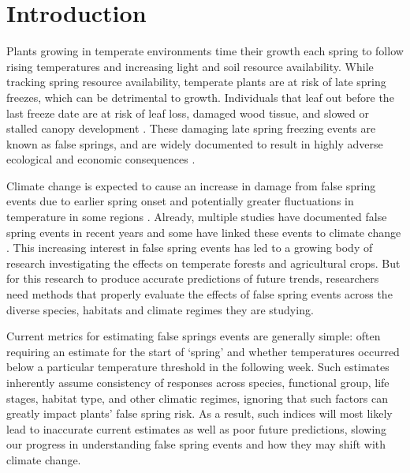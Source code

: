 \documentclass{article}\usepackage[]{graphicx}\usepackage[]{color}
\begin{document}
\section{Introduction}

Plants growing in temperate environments time their growth each spring to follow rising temperatures and increasing light and soil resource availability. While tracking spring resource availability, temperate plants are at risk of late spring freezes, which can be detrimental to growth. Individuals that leaf out before the last freeze date are at risk of leaf loss, damaged wood tissue, and slowed or stalled canopy development \citep{Gu2008, Hufkens2012}. These damaging late spring freezing events are known as false springs, and are widely documented to result in highly adverse ecological and economic consequences \citep{Knudson2012, Ault2013}.

Climate change is expected to cause an increase in damage from false spring events due to earlier spring onset and potentially greater fluctuations in temperature in some regions \citep{Cannell1986, Inouye2008, Martin2010}. Already, multiple studies have documented false spring events in recent years \citep{Gu2008, Augspurger2009, Knudson2012, Augspurger2013} and some have linked these events to climate change \citep{Ault2013, Allstadt2015, Muffler2016, Xin2016}. This increasing interest in false spring events has led to a growing body of research investigating the effects on temperate forests and agricultural crops. But for this research to produce accurate predictions of future trends, researchers need methods that properly evaluate the effects of false spring events across the diverse species, habitats and climate regimes they are studying. 

Current metrics for estimating false springs events are generally simple: often requiring an estimate for the start of `spring' and whether temperatures occurred below a particular temperature threshold in the following week. Such estimates inherently assume consistency of responses across species, functional group, life stages, habitat type, and other climatic regimes, ignoring that such factors can greatly impact plants' false spring risk. As a result, such indices will most likely lead to inaccurate current estimates as well as poor future predictions, slowing our progress in understanding false spring events and how they may shift with climate change. 
\end{document}
